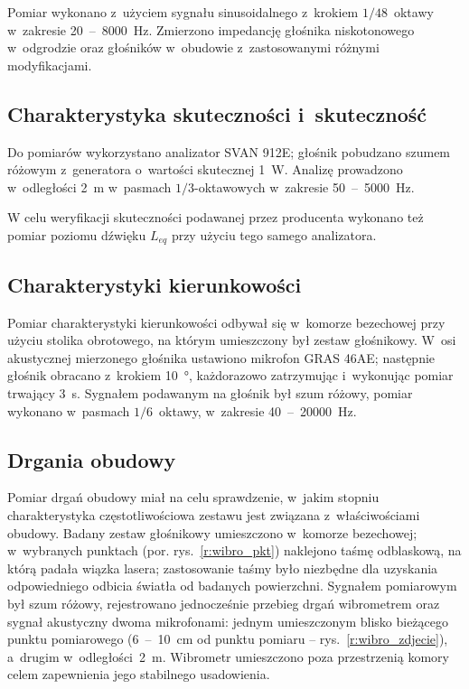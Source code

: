 \documentclass[12pt]{oska}
\newcommand{\range}[2]{\num{#1}~--~\num{#2}}
\begin{document}
			
			Pomiar wykonano z~użyciem sygnału sinusoidalnego z~krokiem $1/48$~oktawy w~zakresie \range{20}{8000}~\si{\hertz}. Zmierzono impedancję głośnika niskotonowego w~odgrodzie oraz głośników w~obudowie z~zastosowanymi różnymi modyfikacjami. 
			
		\subsection{Charakterystyka skuteczności i~skuteczność}
			
			Do pomiarów wykorzystano analizator SVAN 912E; głośnik pobudzano szumem różowym z~generatora o~wartości skutecznej \SI{1}{\watt}. Analizę prowadzono w~odległości \SI{2}{\metre} w~pasmach $1/3$-oktawowych w~zakresie \range{50}{5000}~\si{\hertz}.

			W celu weryfikacji skuteczności podawanej przez producenta wykonano też pomiar poziomu dźwięku $L_{eq}$ przy użyciu tego samego analizatora. 
			
		\subsection{Charakterystyki kierunkowości}
			
			
			Pomiar charakterystyki kierunkowości odbywał się w~komorze bezechowej przy użyciu stolika obrotowego, na którym umieszczony był zestaw głośnikowy. W~osi akustycznej mierzonego głośnika ustawiono mikrofon GRAS 46AE; następnie głośnik obracano z~krokiem \SI{10}{\degree}, każdorazowo zatrzymując i~wykonując pomiar trwający \SI{3}{\s}. Sygnałem podawanym na głośnik był szum różowy, pomiar wykonano w~pasmach $1/6$~oktawy, w~zakresie \range{40}{20000}~\si{\hertz}.
			
		\subsection{Drgania obudowy}
			
			Pomiar drgań obudowy miał na celu sprawdzenie, w~jakim stopniu charakterystyka częstotliwościowa zestawu jest związana z~właściwościami obudowy. Badany zestaw głośnikowy umieszczono w~komorze bezechowej; w~wybranych punktach (por. rys.~\ref{r:wibro_pkt}) naklejono taśmę odblaskową, na którą padała wiązka lasera; zastosowanie taśmy było niezbędne dla uzyskania odpowiedniego odbicia światła od badanych powierzchni. %
			Sygnałem pomiarowym był szum różowy, rejestrowano jednocześnie przebieg drgań wibrometrem oraz sygnał akustyczny dwoma mikrofonami: jednym umieszczonym blisko bieżącego punktu pomiarowego (\range{6}{10}~\si{\cm} od punktu pomiaru -- rys.~\ref{r:wibro_zdjecie}), a~drugim w~odległości~\SI{2}{\metre}. Wibrometr umieszczono poza przestrzenią komory celem zapewnienia jego stabilnego usadowienia.
			
\end{document}
